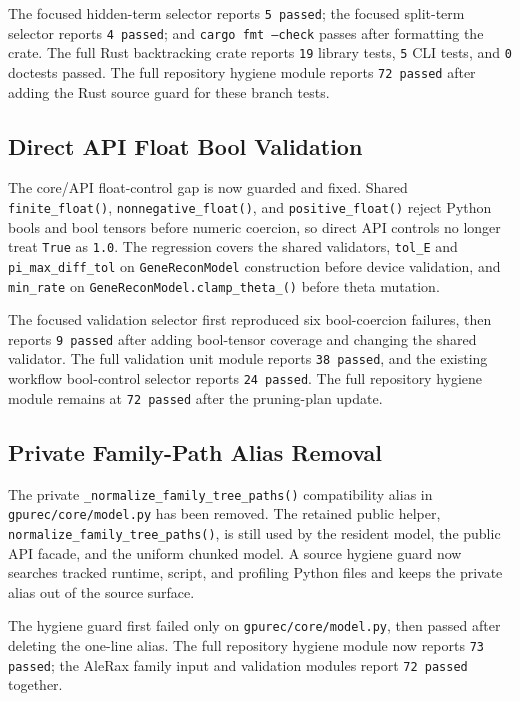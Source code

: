 \documentclass[11pt]{article}
\begin{document}
The focused hidden-term selector reports \texttt{5 passed}; the focused
split-term selector reports \texttt{4 passed}; and \texttt{cargo fmt --check}
passes after formatting the crate.  The full Rust backtracking crate reports
\texttt{19} library tests, \texttt{5} CLI tests, and \texttt{0} doctests
passed.  The full repository hygiene module reports \texttt{72 passed} after
adding the Rust source guard for these branch tests.

\subsection{Direct API Float Bool Validation}

The core/API float-control gap is now guarded and fixed.  Shared
\texttt{finite\_float()}, \texttt{nonnegative\_float()}, and
\texttt{positive\_float()} reject Python bools and bool tensors before numeric
coercion, so direct API controls no longer treat \texttt{True} as
\texttt{1.0}.  The regression covers the shared validators, \texttt{tol\_E}
and \texttt{pi\_max\_diff\_tol} on \texttt{GeneReconModel} construction before
device validation, and \texttt{min\_rate} on
\texttt{GeneReconModel.clamp\_theta\_()} before theta mutation.

The focused validation selector first reproduced six bool-coercion failures,
then reports \texttt{9 passed} after adding bool-tensor coverage and changing
the shared validator.  The full validation unit module reports
\texttt{38 passed}, and the existing workflow bool-control selector reports
\texttt{24 passed}.  The full repository hygiene module remains at
\texttt{72 passed} after the pruning-plan update.

\subsection{Private Family-Path Alias Removal}

The private \texttt{\_normalize\_family\_tree\_paths()} compatibility alias in
\texttt{gpurec/core/model.py} has been removed.  The retained public helper,
\texttt{normalize\_family\_tree\_paths()}, is still used by the resident model,
the public API facade, and the uniform chunked model.  A source hygiene guard
now searches tracked runtime, script, and profiling Python files and keeps the
private alias out of the source surface.

The hygiene guard first failed only on \texttt{gpurec/core/model.py}, then
passed after deleting the one-line alias.  The full repository hygiene module
now reports \texttt{73 passed}; the AleRax family input and validation modules
report \texttt{72 passed} together.
\end{document}
